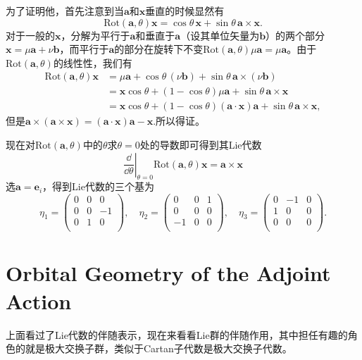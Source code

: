 \documentclass[9pt]{extbook}
\theoremstyle{plain}
\begin{document}
为了证明他，首先注意到当$\mathbf{a}$和$\mathbf{x}$垂直的时候显然有
\[
\mathrm{Rot}(\mathbf{a},\theta)\mathbf{x}=\cos\theta\,\mathbf{x}+
\sin\theta\,\mathbf{a}\times\mathbf{x}.
\]
对于一般的$\mathbf{x}$，分解为平行于$\mathbf{a}$和垂直于$\mathbf{a}$（设其单位矢量为$\mathbf{b}$）的两个部分$\mathbf{x}=\mu\mathbf{a}+\nu\mathbf{b}$，而平行于$\mathbf{a}$的部分在旋转下不变$\mathrm{Rot}(\mathbf{a},\theta)\mu\mathbf{a}=\mu\mathbf{a}$。由于$\mathrm{Rot}(\mathbf{a},\theta)$的线性性，我们有
\[
\begin{split}
\mathrm{Rot}(\mathbf{a},\theta)\mathbf{x}&=\mu\mathbf{a}+\cos\theta\,(\nu\mathbf{b})+
\sin\theta\,\mathbf{a}\times(\nu\mathbf{b})\\
&=\mathbf{x}\cos\theta+(1-\cos\theta)\mu\mathbf{a}+
\sin\theta\,\mathbf{a}\times\mathbf{x}\\
&=\mathbf{x}\cos\theta+(1-\cos\theta)(\mathbf{a}\cdot\mathbf{x})\mathbf{a}+
\sin\theta\,\mathbf{a}\times \mathbf{x},
\end{split}
\]
但是$\mathbf{a}\times(\mathbf{a}\times\mathbf{x})=(\mathbf{a}\cdot\mathbf{x})\mathbf{a}-\mathbf{x}$.所以得证。

现在对$\mathrm{Rot}(\mathbf{a},\theta)$中的$\theta$求$\theta=0$处的导数即可得到其Lie代数
\[
\left.\frac{\dd}{\dd \theta}\right|_{\theta=0}\mathrm{Rot}(\mathbf{a},\theta)\mathbf{x}=\mathbf{a}\times\mathbf{x}
\]
选$\mathbf{a}=\mathbf{e}_i$，得到Lie代数的三个基为
\[
	\eta_1=
		\begin{pmatrix}
			0&0&0\\
			0&0&-1\\
			0&1&0\\
		\end{pmatrix},\quad
	\eta_2=
		\begin{pmatrix}
			0&0&1\\
			0&0&0\\
			-1&0&0\\
		\end{pmatrix},\quad
	\eta_3=
		\begin{pmatrix}
			0&-1&0\\
			1&0&0\\
			0&0&0\\
		\end{pmatrix}.
\]
\section{Orbital Geometry of the Adjoint Action}
上面看过了Lie代数的伴随表示，现在来看看Lie群的伴随作用，其中担任有趣的角色的就是极大交换子群，类似于Cartan子代数是极大交换子代数。
\end{document}
